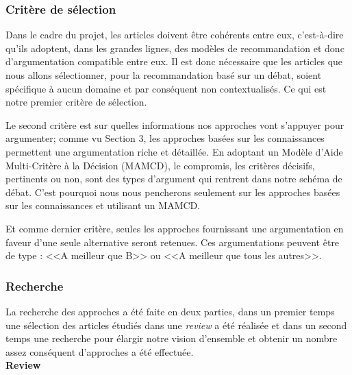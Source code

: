 \documentclass[a4paper, 11pt]{article}
\renewcommand{\textbf}[1]{\begingroup\bfseries\mathversion{bold}#1\endgroup}
\begin{document}
\subsubsection{Critère de sélection}

Dans le cadre du projet, les articles doivent être cohérents entre eux, c'est-à-dire qu'ils adoptent, dans les grandes lignes, des modèles de recommandation et donc d'argumentation compatible entre eux. Il est donc nécessaire que les articles que nous allons sélectionner, pour la recommandation basé sur un débat, soient spécifique à aucun domaine et par conséquent non contextualisés. Ce qui est notre premier critère de sélection.

Le second critère est sur quelles informations nos approches vont s'appuyer pour argumenter; comme vu Section 3, les approches basées sur les connaissances permettent une argumentation riche et détaillée. En adoptant un Modèle d'Aide Multi-Critère à la Décision  (MAMCD), le compromis, les critères décisifs, pertinents ou non, sont des types d'argument qui rentrent dans notre schéma de débat. C'est pourquoi nous nous pencherons seulement sur les approches basées sur les connaissances et utilisant un MAMCD.


Et comme dernier critère, seules les approches fournissant une argumentation en faveur d'une seule alternative seront retenues. Ces argumentations peuvent être de type : <<A meilleur que B>> ou <<A meilleur que tous les autres>>.

\subsubsection{Recherche}

La recherche des approches a été faite en deux parties, dans un premier temps une sélection des articles étudiés dans une \textit{review} \textcolor{blue}{\citep{NunesJannachUmuai2017}} a été réalisée et dans un second temps une recherche pour élargir notre vision d'ensemble et obtenir un nombre assez conséquent d'approches a été effectuée.\\

\noindent \textbf{Review}\newline
\end{document}
